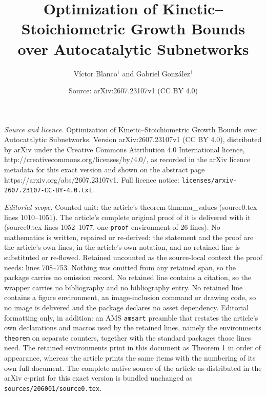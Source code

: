 \documentclass[10pt,a4paper]{amsart}
\title{\Large Optimization of Kinetic--Stoichiometric Growth Bounds over Autocatalytic Subnetworks}
\author{{\large V\'ictor Blanco$^{\dagger}$ and Gabriel Gonz\'alez$^{\ddagger}$}\bigskip}
\date{Source: arXiv:2607.23107v1 (CC BY 4.0)}
\begin{document}
\maketitle

\noindent\emph{Source and licence.} \Large Optimization of Kinetic--Stoichiometric Growth Bounds over Autocatalytic Subnetworks. Version arXiv:2607.23107v1 (CC BY 4.0), distributed by arXiv under the Creative Commons Attribution 4.0 International licence, http://creativecommons.org/licenses/by/4.0/, as recorded in the arXiv licence metadata for this exact version and shown on the abstract page https://arxiv.org/abs/2607.23107v1. Full licence notice: \texttt{licenses/arxiv-2607.23107-CC-BY-4.0.txt}.\par\smallskip

\noindent\textit{Editorial scope.} Counted unit: the article's theorem thm:mu\_values (source0.tex lines 1010--1051). The article's complete original proof of it is delivered with it (source0.tex lines 1052--1077, one \texttt{proof} environment of 26 lines). No mathematics is written, repaired or re-derived: the statement and the proof are the article's own lines, in the article's own notation, and no retained line is substituted or re-flowed.  Retained uncounted as the source-local context the proof needs: lines 708--753.  Nothing was omitted from any retained span, so the package carries no omission record.  No retained line contains a citation, so the wrapper carries no bibliography and no bibliography entry.  No retained line contains a figure environment, an image-inclusion command or drawing code, so no image is delivered and the package declares no asset dependency.  Editorial formatting only, in addition: an AMS \texttt{amsart} preamble that restates the article's own declarations and macros used by the retained lines, namely the environments \texttt{theorem} on separate counters, together with the standard packages those lines need.  The retained environments print in this document as Theorem 1 in order of appearance, whereas the article prints the same items with the numbering of its own full document.  The complete native source of the article as distributed in the arXiv e-print for this exact version is bundled unchanged as \texttt{sources/206001/source0.tex}.
\end{document}
